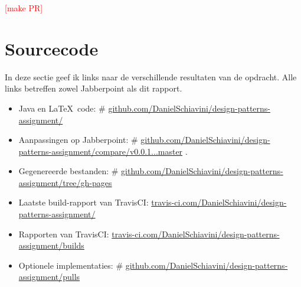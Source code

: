\documentclass[a4paper]{article}
\makeatletter
\newcommand{\todo}[1]{\textcolor{red}{[#1]}\\}
\newcommand*{\repo}{\begingroup\@makeother\#\@repo}
\newcommand*{\@repo}[2]{%
  \href{https://github.com/DanielSchiavini/design-patterns-assignment/#1}{#2}%
  \endgroup}
\newcommand{\repolink}[1]{\repo{#1}{github.com/DanielSchiavini/design-patterns-assignment/#1}}
\newcommand{\cilink}[1]{\href{https://travis-ci.com/DanielSchiavini/design-patterns-assignment/#1}{travis-ci.com/DanielSchiavini/design-patterns-assignment/#1}}
\makeatother
\begin{document}
    \todo{make PR}

\section{Sourcecode}
In deze sectie geef ik links naar de verschillende resultaten van de opdracht.
Alle links betreffen zowel Jabberpoint als dit rapport.
\begin{itemize}
    \item Java en \LaTeX ~code:
        \repolink{}
    \item Aanpassingen op Jabberpoint:
        \repolink{compare/v0.0.1...master}.
    \item Gegenereerde bestanden:
        \repolink{tree/gh-pages}
    \item Laatste build-rapport van TravisCI:
        \cilink{}
    \item Rapporten van TravisCI:
        \cilink{builds}
    \item Optionele implementaties:
        \repolink{pulls}
\end{itemize}
\end{document}
